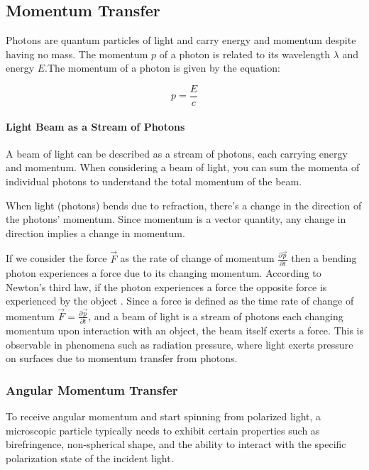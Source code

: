 \documentclass[12pt,english]{scrartcl}
\begin{document}
\subsection{Momentum Transfer}\label{sec:momentumTransfer}


Photons are quantum particles of light and carry energy and momentum despite
having no mass. The momentum $p$ of a photon is related to its wavelength
$\lambda$ and energy $E$\cite{einsteinZurQuantentheoriederStrahlung1917}.The
momentum of a photon is given by the equation:

\begin{equation}
	p = \frac{E}{c}
\end{equation}

\paragraph{Light Beam as a Stream of Photons}

A beam of light can be described as a stream of photons, each carrying energy
and momentum. When considering a beam of light, you can sum the momenta of
individual photons to understand the total momentum of the beam.

When light (photons) bends due to refraction, there's a change in the direction
of the photons' momentum. Since momentum is a vector quantity, any change in
direction implies a change in momentum.

If we consider the force $\vec{F}$ as the rate of change of momentum
$\frac{\partial\vec{p}}{\partial t}$ then a bending photon experiences a force
due to its changing momentum. According to Newton's third law, if the photon
experiences a force the opposite force is experienced by the object . Since a
force is defined as the time rate of change of momentum $\vec{F} =
	\frac{\partial\vec{p}}{\partial t}$, and a beam of light is a stream of photons
each changing momentum upon interaction with an object, the beam itself exerts
a force. This is observable in phenomena such as radiation pressure, where
light exerts pressure on surfaces due to momentum transfer from
photons.\cite{bustamanteOpticalTweezersSinglemolecule2021}


\subsubsection{Angular Momentum Transfer}\label{sec:angularMomentumTransfer}
To receive angular momentum and start spinning from polarized light, a
microscopic particle typically needs to exhibit certain properties such as
birefringence, non-spherical shape, and the ability to interact with the
specific polarization state of the incident light.
\end{document}
